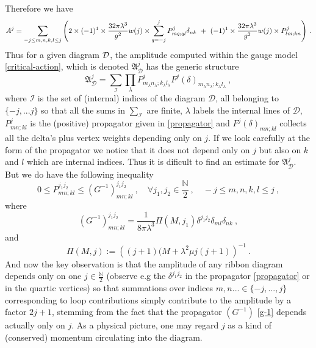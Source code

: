 \documentclass[a4paper,11pt,twoside]{article}
\numberwithin{equation}{section}
\theoremstyle{nonumberplain}
\newcounter{and}
\begin{document}
%
Therefore we have%
%
\begin{equation*}
A^j = \sum_{-j\leq m,n,k,l \leq j} \Bigg( 
2 \times (-1)^1 \times \frac{32\pi\lambda^3}{g^2}w(j) \times \sum_{q=-j}^j P^j_{mq;ql} \delta_{nk}
\ + \ (-1)^1 \times \frac{32\pi\lambda^3}{g^2}w(j) \times P^j_{lm;kn}
\Bigg) \ .
\vspace*{5pt}
\end{equation*}
% 
Thus for a given diagram ${\cal{D}}$, the amplitude computed within the gauge model \eqref{critical-action}, which is denoted $\mathfrak{A}^j_{\mathcal{D}}$ has the generic structure%
%
\begin{equation}
\mathfrak{A}^j_{\mathcal{D}} = \sum_{\mathcal{I}} \prod_\lambda P^j_{m_\lambda n_\lambda;k_\lambda l_\lambda} F^j(\delta)_{m_\lambda n_\lambda;k_\lambda l_\lambda} \ ,\label{amplit-arb}
\end{equation}
%
where $\mathcal{I}$ is the set of (internal) indices of the diagram $\mathcal{D}$, all belonging to $\{-j,...j\}$ so that all the sums in $\sum_{\mathcal{I}}$ are finite, $\lambda$ labels the internal lines of $\mathcal{D}$, $P^j_{mn;kl}$ is the (positive) propagator given in \eqref{propagator} and $F^j(\delta)_{mn;kl}$ collects all the delta's plus vertex weights depending only on $j$. %
%
If we look carefully at the form of the propagator we notice that it does not depend only on $j$ but also on $k$ and $l$ which are internal indices. Thus it is dificult to find an estimate for $\mathfrak{A}^j_{\mathcal{D}}$. But we do have the following inequality%
%
\begin{equation}
0\le P^{j_1j_2}_{mn;kl}\le(G^{-1})^{j_1j_2}_{mn;kl} \ , \quad \forall j_1,j_2\in\frac{\mathbb{N}}{2}\ , \quad -j\le m,n,k,l\le j \ ,\label{envelop-model}
\end{equation}
%
where%
%
\begin{equation} 
(G^{-1})^{j_1j_2}_{mn;kl} = \frac{1}{8\pi\lambda^3} \Pi(M,j_1) \delta^{j_1j_2}\delta_{ml}\delta_{nk} \ , \label{g-1}
\end{equation}
%
and%
%
\begin{equation}
\Pi(M,j) := \left((j+1)(M+\lambda^2\mu j(j+1)\right)^{-1} \ . \label{Pi}
\end{equation}
%
And now the key observation is that the amplitude of any ribbon diagram depends only on one $j\in\frac{\mathbb{N}}{2}$ (observe e.g the $\delta^{j_1j_2}$ in the propagator \eqref{propagator} or in the quartic vertices) so that summations over indices $m,n...\in\{-j,...,j\}$ corresponding to loop contributions simply contribute to the amplitude by a factor $2j+1$, stemming from the fact that the propagator $(G^{-1})$ \eqref{g-1} depends actually only on $j$. As a physical picture, one may regard $j$ as a kind of (conserved) momentum circulating into the diagram. \par%
\end{document}
